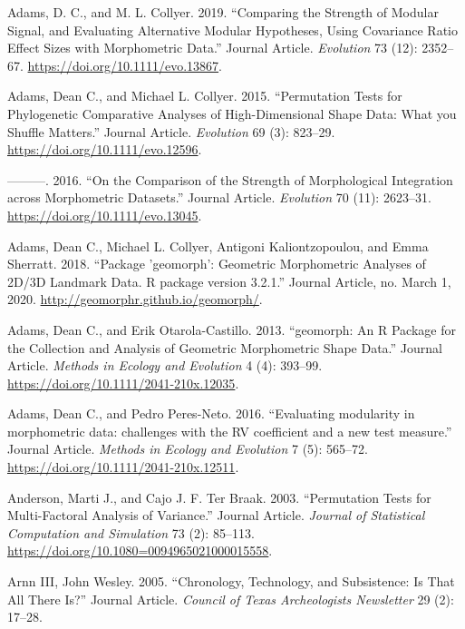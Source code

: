 \documentclass[smallextended]{svjour3}       %
\newlength{\cslhangindent}
\newlength{\cslentryspacingunit} %
\newenvironment{CSLReferences}[2] %
 {%
  \setlength{\parindent}{0pt}
  \ifodd #1
  \let\oldpar\par
  \def\par{\hangindent=\cslhangindent\oldpar}
  \fi
  \setlength{\parskip}{#2\cslentryspacingunit}
 }%
 {}
\begin{document}
\hypertarget{refs}{}
\begin{CSLReferences}{1}{0}
\leavevmode{}%
Adams, D. C., and M. L. Collyer. 2019. {``Comparing the Strength of
Modular Signal, and Evaluating Alternative Modular Hypotheses, Using
Covariance Ratio Effect Sizes with Morphometric Data.''} Journal
Article. \emph{Evolution} 73 (12): 2352--67.
\url{https://doi.org/10.1111/evo.13867}.

\leavevmode{}%
Adams, Dean C., and Michael L. Collyer. 2015. {``{Permutation Tests for
Phylogenetic Comparative Analyses of High-Dimensional Shape Data: What
you Shuffle Matters}.''} Journal Article. \emph{Evolution} 69 (3):
823--29. \url{https://doi.org/10.1111/evo.12596}.

\leavevmode{}%
---------. 2016. {``{On the Comparison of the Strength of Morphological
Integration across Morphometric Datasets}.''} Journal Article.
\emph{Evolution} 70 (11): 2623--31.
\url{https://doi.org/10.1111/evo.13045}.

\leavevmode{}%
Adams, Dean C., Michael L. Collyer, Antigoni Kaliontzopoulou, and Emma
Sherratt. 2018. {``{Package 'geomorph': Geometric Morphometric Analyses
of 2D/3D Landmark Data. R package version 3.2.1}.''} Journal Article,
no. March 1, 2020. \url{http://geomorphr.github.io/geomorph/}.

\leavevmode{}%
Adams, Dean C., and Erik Otarola-Castillo. 2013. {``{geomorph: An R
Package for the Collection and Analysis of Geometric Morphometric Shape
Data}.''} Journal Article. \emph{Methods in Ecology and Evolution} 4
(4): 393--99. \url{https://doi.org/10.1111/2041-210x.12035}.

\leavevmode{}%
Adams, Dean C., and Pedro Peres-Neto. 2016. {``{Evaluating modularity in
morphometric data: challenges with the RV coefficient and a new test
measure}.''} Journal Article. \emph{Methods in Ecology and Evolution} 7
(5): 565--72. \url{https://doi.org/10.1111/2041-210x.12511}.

\leavevmode{}%
Anderson, Marti J., and Cajo J. F. Ter Braak. 2003. {``{Permutation
Tests for Multi-Factoral Analysis of Variance}.''} Journal Article.
\emph{Journal of Statistical Computation and Simulation} 73 (2):
85--113. \url{https://doi.org/10.1080=0094965021000015558}.

\leavevmode{}%
Arnn III, John Wesley. 2005. {``{Chronology, Technology, and
Subsistence: Is That All There Is?}''} Journal Article. \emph{Council of
Texas Archeologists Newsletter} 29 (2): 17--28.


\end{CSLReferences}
\end{document}
